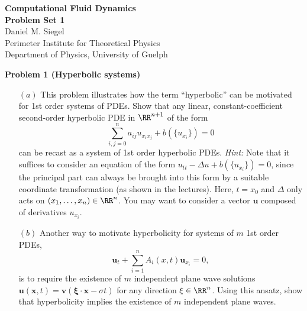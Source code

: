 \documentclass[letter,11pt]{article}
\begin{document}
\pagestyle{problem_set}


\phantom{.}
\begin{center}
{\Large\textbf{Computational Fluid Dynamics\\[0.4cm] Problem Set 1}} \\[0.7cm]
Daniel M. Siegel \\[0.1cm]
Perimeter Institute for Theoretical Physics\\
Department of Physics, University of Guelph
\end{center}

\vspace{1cm}

{\noindent\large\textbf{Problem 1 (Hyperbolic systems)}}%

\begin{itemize}
  \item[$(a)$] This problem illustrates how the term ``hyperbolic'' can be motivated for 1st order systems of PDEs. Show that any linear, constant-coefficient second-order hyperbolic PDE in $\RR^{n+1}$ of the form
  \begin{equation}
    \sum_{i,j = 0}^{n} a_{ij} u_{x_i x_j} + b(\{u_{x_i}\}) = 0
  \end{equation}
   can be recast as a system of 1st order hyperbolic PDEs. \newline
   \emph{Hint:} Note that it suffices to consider an equation of the form $u_{tt}-\Delta u + b(\{u_{x_i}\}) = 0$, since the principal part can always be brought into this form by a suitable coordinate transformation (as shown in the lectures). Here, $t=x_0$ and $\Delta$ only acts on $(x_1,\ldots,x_n)\in\RR^n$. You may want to consider a vector $\mathbf{u}$ composed of derivatives $u_{x_i}$.

   \item[$(b)$] Another way to motivate hyperbolicity for systems of $m$ 1st order PDEs,
    \begin{equation}
    \mathbf{u}_t + \sum_{i=1}^{n} A_{i}(x,t) \mathbf{u}_{x_i} = 0,
    \end{equation}
    is to  require the existence of $m$ independent plane wave solutions $\mathbf{u}(\mathbf{x},t) = \mathbf{v}(\mathbf{\xi\cdot x} - \sigma t)$ for any direction $\xi\in\RR^n$. Using this ansatz, show that hyperbolicity implies the existence of $m$ independent plane waves.
\end{itemize}

\vspace{1cm}
\end{document}
